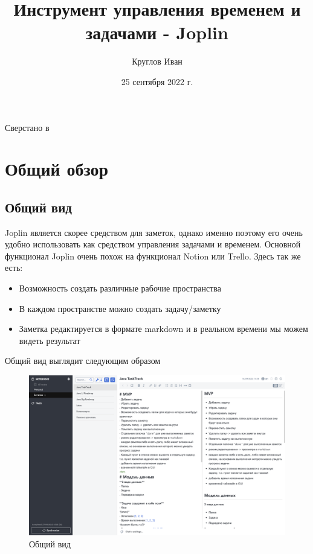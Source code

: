 \documentclass[12pt, a4paper]{article}
\author{Круглов Иван}
\title{\textbf{Инструмент управления временем и задачами - Joplin}}
\date{25 сентября 2022 г.}
\begin{document}
    \begin{Huge}
        \maketitle
    \end{Huge}
    \null
    \vfill
    \begin{turn}{-45} 
        \Huge{Сверстано в \XeLaTeX}
    \end{turn}
    

    \newpage
    \tableofcontents

    \newpage
    \section{Общий обзор}
    \subsection{Общий вид}
    Joplin является скорее средством для заметок, однако именно поэтому его очень удобно
    использовать как средством управления задачами и временем.
    Основной функционал Joplin очень похож на функционал Notion или Trello.
    Здесь так же есть:
    \begin{itemize}
        \item Возможность создать различные рабочие пространства
        \item В каждом пространстве можно создать задачу/заметку
        \item Заметка редактируется в формате markdown и в реальном времени мы можем видеть результат
    \end{itemize}
    Общий вид выглядит следующим образом

    \begin{figure}[H]
        \centering
        \includegraphics[width=0.95\linewidth]{src/1.png}
        \caption{Общий вид}
    \end{figure}
\end{document}
